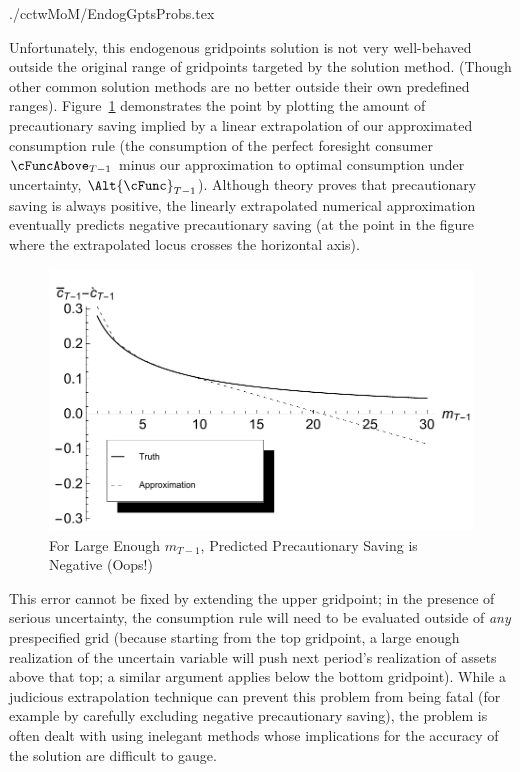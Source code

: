 \documentclass[titlepage]{\econtex}
\begin{document}
\begin{verbatimwrite}{./cctwMoM/EndogGptsProbs.tex}

  Unfortunately, this endogenous gridpoints solution is not very
  well-behaved outside the original range of gridpoints targeted by
  the solution method.  (Though other common solution methods are no
  better outside their own predefined ranges).
  Figure~\ref{fig:ExtrapProblem} demonstrates the point by plotting
  the amount of precautionary saving implied by a linear extrapolation
  of our approximated consumption rule (the consumption of the perfect
  foresight consumer $\cFuncAbove_{T-1}$ minus our approximation to
  optimal consumption under uncertainty, $\Alt{\cFunc}_{T-1}$).
  Although theory proves that precautionary saving is always positive,
  the linearly extrapolated numerical approximation eventually
  predicts negative precautionary saving (at the point in the figure
  where the extrapolated locus crosses the horizontal axis).

\hypertarget{ExtrapProblemPlot}{}
\begin{figure}
        \includegraphics{./Figures/ExtrapProblemPlot}
        \caption{For Large Enough ${m}_{T-1}$, Predicted Precautionary Saving is Negative (Oops!)}
        \label{fig:ExtrapProblem}
\end{figure}

This error cannot be fixed by extending the upper gridpoint; in the
presence of serious uncertainty, the consumption rule will need to be
evaluated outside of \textit{any} prespecified grid (because starting
from the top gridpoint, a large enough realization of the uncertain
variable will push next period's realization of assets above that
top; a similar argument applies below the bottom gridpoint).  While a judicious extrapolation technique can prevent this
problem from being fatal (for example by carefully excluding negative
precautionary saving), the problem is often dealt with using inelegant
methods whose implications for the accuracy of the solution are
difficult to gauge.
\end{verbatimwrite}

\end{document}
